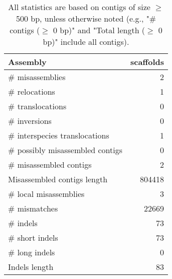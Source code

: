 \documentclass[12pt,a4paper]{article}
\begin{document}
\begin{table}[ht]
\begin{center}
\caption{All statistics are based on contigs of size $\geq$ 500 bp, unless otherwise noted (e.g., "\# contigs ($\geq$ 0 bp)" and "Total length ($\geq$ 0 bp)" include all contigs).}
\begin{tabular}{|l*{1}{|r}|}
\hline
Assembly & scaffolds \\ \hline
\# misassemblies & 2 \\ \hline
\hspace{5mm}\# relocations & 1 \\ \hline
\hspace{5mm}\# translocations & 0 \\ \hline
\hspace{5mm}\# inversions & 0 \\ \hline
\hspace{5mm}\# interspecies translocations & 1 \\ \hline
\# possibly misassembled contigs & 0 \\ \hline
\# misassembled contigs & 2 \\ \hline
Misassembled contigs length & 804418 \\ \hline
\# local misassemblies & 3 \\ \hline
\# mismatches & 22669 \\ \hline
\# indels & 73 \\ \hline
\hspace{5mm}\# short indels & 73 \\ \hline
\hspace{5mm}\# long indels & 0 \\ \hline
Indels length & 83 \\ \hline
\end{tabular}
\end{center}
\end{table}
\end{document}

